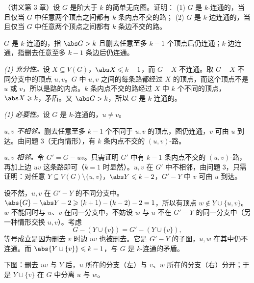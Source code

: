 \begin{workedexample}[问题 4]\label{we:yan-ch3-problems:whitney}
（讲义第 3 章）设 $G$ 是阶大于 $k$ 的简单无向图。证明：
(1) $G$ 是 $k$-连通的，当且仅当 $G$ 中任意两个顶点之间都有 $k$ 条内点不交的路；
(2) $G$ 是 $k$-边连通的，当且仅当 $G$ 中任意两个顶点之间都有 $k$ 条边不交的路。
\end{workedexample}
\begin{solution}
$G$ 是 $k$-连通的，指 $\abs G>k$ 且删去任意至多 $k-1$ 个顶点后仍连通；$k$-边连通，指删去任意至多 $k-1$ 条边后仍连通。

\emph{(1) 充分性。}设 $X\subseteq V(G)$，$\abs X\leqslant k-1$，而 $G-X$ 不连通。取 $G-X$ 不同分支中的顶点 $u,v$。$G$ 中 $u,v$ 之间的每条路都经过 $X$ 的顶点，而这个顶点不是 $u$ 或 $v$，所以是路的内点。$k$ 条内点不交的路经过 $X$ 中 $k$ 个不同的顶点，$\abs X\geqslant k$，矛盾。又 $\abs G>k$，所以 $G$ 是 $k$-连通的。

\emph{(1) 必要性。}设 $G$ 是 $k$-连通的，$u\neq v$。

\emph{$u,v$ 不相邻。}删去任意至多 $k-1$ 个不同于 $u,v$ 的顶点，图仍连通，$v$ 可由 $u$ 到达。由问题 3（无向情形），有 $k$ 条内点不交的 $(u,v)$-路。

\emph{$u,v$ 相邻。}令 $G'=G-uv$。只需证明 $G'$ 中有 $k-1$ 条内点不交的 $(u,v)$-路，再加上边 $uv$ 这条路即可（$k=1$ 时显然）。$u,v$ 在 $G'$ 中不相邻，由问题 3，只需证明：对任意 $Y\subseteq V(G)\setminus\{u,v\}$，$\abs Y\leqslant k-2$，$G'-Y$ 中 $v$ 可由 $u$ 到达。

设不然，$u,v$ 在 $G'-Y$ 的不同分支中。$\abs{G}-\abs Y-2\geqslant(k+1)-(k-2)-2=1$，所以有顶点 $w\notin Y\cup\{u,v\}$。$w$ 不能同时与 $u$、$v$ 在同一分支中，不妨设 $w$ 与 $u$ 不在 $G'-Y$ 的同一分支中（另一种情形交换 $u,v$）。考虑
\[
G-(Y\cup\{v\})=G'-(Y\cup\{v\}),
\]
等号成立是因为删去 $v$ 时边 $uv$ 也被删去。它是 $G'-Y$ 的子图，$u,w$ 在其中仍不连通。而 $\abs{Y\cup\{v\}}\leqslant k-1$，与 $G$ 是 $k$-连通的矛盾。

下图：删去 $uv$ 与 $Y$ 后，$u$ 所在的分支（左）与 $v$、$w$ 所在的分支（右）分开；于是 $Y\cup\{v\}$ 在 $G$ 中分离 $u$ 与 $w$。
\begin{center}
\end{center}


\end{solution}
